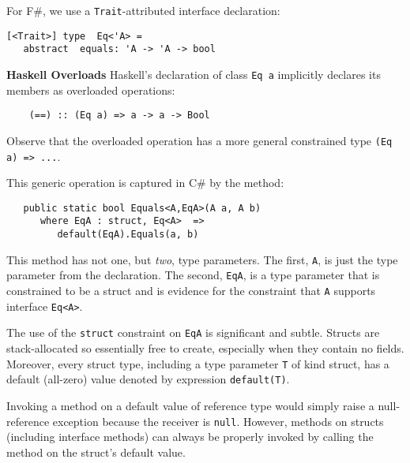 \documentclass[9pt]{sig-alternate-05-2015}
\newif\ifclassic
\begin{document}
\ifclassic
For new F\# syntax we adopt the keyword \lstinline{concept} (\lstinline{class} is already taken):

\lstset{language={FSharp}}
\begin{lstlisting}
concept Eq 'a where 
    (==): 'a -> 'a -> bool
\end{lstlisting}
\else
For F\#, we use a  \lstinline{Trait}-attributed interface declaration:
\begin{lstlisting}
[<Trait>] type  Eq<'A> = 
   abstract  equals: 'A -> 'A -> bool
\end{lstlisting}
\fi
 
{\bf  Haskell Overloads} Haskell's declaration of class \lstinline{Eq a} implicitly declares its members as overloaded 
operations:

\begin{lstlisting}
    (==) :: (Eq a) => a -> a -> Bool 
\end{lstlisting}
Observe that the overloaded operation has a more general constrained type \lstinline{(Eq a) => ...}.

This generic operation is captured in C\# by the method:
\begin{lstlisting}
   public static bool Equals<A,EqA>(A a, A b) 
      where EqA : struct, Eq<A>  =>
         default(EqA).Equals(a, b)
\end{lstlisting}
This method has not one, but \emph{two}, type parameters. The first, \lstinline{A}, is just the type parameter from the declaration.
The second, \lstinline{EqA}, is a type parameter that is constrained to be a struct and is evidence for the constraint that \lstinline{A} supports interface \lstinline{Eq<A>}.

The use of the \lstinline{struct} constraint on \lstinline{EqA} is significant and subtle. Structs are stack-allocated so essentially free to create, especially when they contain no fields.
Moreover, every struct type, including a type parameter \lstinline{T} of kind struct, has a default (all-zero) value denoted by
 expression \lstinline{default(T)}.

Invoking a method on a default value of reference type would simply raise a null-reference exception because the receiver is \lstinline{null}.
However, methods on structs (including interface methods) can always be properly invoked
by calling the method on the struct's default value. 
\end{document}
